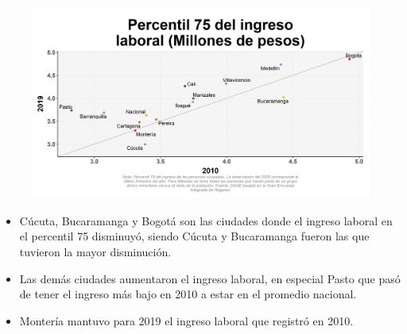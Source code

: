     \begin{figure}[H]
        \caption[Percentil 75 del ingreso laboral por ciudades principales - 2010 VS 2019]{\label{ingreso_laboral_75_ciudades_vs} }
        \begin{center}
        \includegraphics[width=\textwidth,keepaspectratio]{img/var_26455_scatter_time.png}
        \end{center}
    \end{figure}
            \begin{itemize}
                    \item Cúcuta, Bucaramanga y Bogotá son las ciudades donde el ingreso laboral en el percentil 75 disminuyó, siendo Cúcuta y Bucaramanga fueron las que tuvieron la mayor disminución.
                    \item Las demás ciudades aumentaron el ingreso laboral, en especial Pasto que pasó de tener el ingreso más bajo en 2010 a estar en el promedio nacional.
                    \item Montería mantuvo para 2019 el ingreso laboral que registró en 2010.
                \end{itemize}

